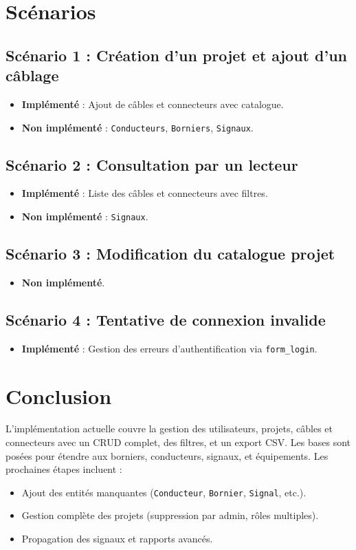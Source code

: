 \documentclass[a4paper,12pt]{article}
\begin{document}
\section{Scénarios}

\subsection{Scénario 1 : Création d’un projet et ajout d’un câblage}
\begin{itemize}
    \item \textbf{Implémenté} : Ajout de câbles et connecteurs avec catalogue.
    \item \textbf{Non implémenté} : \texttt{Conducteurs}, \texttt{Borniers}, \texttt{Signaux}.
\end{itemize}

\subsection{Scénario 2 : Consultation par un lecteur}
\begin{itemize}
    \item \textbf{Implémenté} : Liste des câbles et connecteurs avec filtres.
    \item \textbf{Non implémenté} : \texttt{Signaux}.
\end{itemize}

\subsection{Scénario 3 : Modification du catalogue projet}
\begin{itemize}
    \item \textbf{Non implémenté}.
\end{itemize}

\subsection{Scénario 4 : Tentative de connexion invalide}
\begin{itemize}
    \item \textbf{Implémenté} : Gestion des erreurs d’authentification via \texttt{form\_login}.
\end{itemize}

\section{Conclusion}
L’implémentation actuelle couvre la gestion des utilisateurs, projets, câbles et connecteurs avec un CRUD complet, des filtres, et un export CSV. Les bases sont posées pour étendre aux borniers, conducteurs, signaux, et équipements. Les prochaines étapes incluent :
\begin{itemize}
    \item Ajout des entités manquantes (\texttt{Conducteur}, \texttt{Bornier}, \texttt{Signal}, etc.).
    \item Gestion complète des projets (suppression par admin, rôles multiples).
    \item Propagation des signaux et rapports avancés.
\end{itemize}
\end{document}
